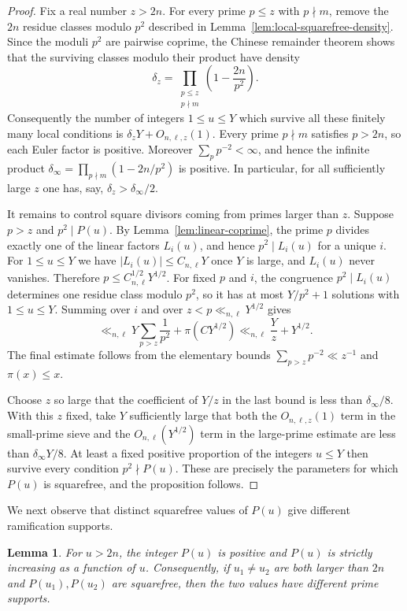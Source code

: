 \documentclass[11pt,hidelinks]{amsart}
\newtheorem{lemma}[theorem]{Lemma}
\begin{document}
\begin{proof}
Fix a real number $z>2n$.  For every prime $p\leq z$ with $p\nmid m$,
remove the $2n$ residue classes modulo $p^2$ described in
Lemma~\ref{lem:local-squarefree-density}.  Since the moduli $p^2$ are
pairwise coprime, the Chinese remainder theorem shows that the surviving
classes modulo their product have density
\[
 \delta_z=\prod_{\substack{p\leq z\\p\nmid m}}
 \left(1-\frac{2n}{p^2}\right).
\]
Consequently the number of integers $1\leq u\leq Y$ which survive all
these finitely many local conditions is
$\delta_zY+O_{n,\ell,z}(1)$.  Every prime $p\nmid m$ satisfies
$p>2n$, so each Euler factor is positive.  Moreover $\sum_pp^{-2}<\infty$, and hence the infinite product $\delta_\infty=\prod_{p\nmid m}(1-2n/p^2)$ is positive. In particular, for all sufficiently large $z$ one has, say,
$\delta_z>\delta_\infty/2$.

It remains to control square divisors coming from primes larger than
$z$.  Suppose $p>z$ and $p^2\mid P(u)$.  By
Lemma~\ref{lem:linear-coprime}, the prime $p$ divides exactly one of the
linear factors $L_i(u)$, and hence $p^2\mid L_i(u)$ for a unique $i$.
For $1\leq u\leq Y$ we have $|L_i(u)|\leq C_{n,\ell}Y$ once $Y$ is
large, and $L_i(u)$ never vanishes.  Therefore
$p\leq C_{n,\ell}^{1/2}Y^{1/2}$.  For fixed $p$ and $i$, the congruence
$p^2\mid L_i(u)$ determines one residue class modulo $p^2$, so it has at
most $Y/p^2+1$ solutions with $1\leq u\leq Y$.  Summing over $i$ and
over $z<p\ll_{n,\ell}Y^{1/2}$ gives
\[
 \ll_{n,\ell}
 Y\sum_{p>z}\frac1{p^2}
 +\pi(CY^{1/2})
 \ll_{n,\ell}
 \frac{Y}{z}+Y^{1/2}.
\]
The final estimate follows from the elementary bounds
$\sum_{p>z}p^{-2}\ll z^{-1}$ and $\pi(x)\leq x$.

Choose $z$ so large that the coefficient of $Y/z$ in the last bound is
less than $\delta_\infty/8$.  With this $z$ fixed, take $Y$ sufficiently
large that both the $O_{n,\ell,z}(1)$ term in the small-prime sieve and
the $O_{n,\ell}(Y^{1/2})$ term in the large-prime estimate are less than
$\delta_\infty Y/8$.  At least a fixed positive proportion of the
integers $u\leq Y$ then survive every condition $p^2\nmid P(u)$.
These are precisely the parameters for which $P(u)$ is squarefree,
and the proposition follows.
\end{proof}

We next observe that distinct squarefree values of $P(u)$ give different ramification supports.

\begin{lemma}\label{lem:distinct-values}
For $u>2n$, the integer $P(u)$ is positive and $P(u)$ is strictly increasing as a function of $u$. Consequently, if $u_1\neq u_2$ are both larger than $2n$ and $P(u_1),P(u_2)$ are squarefree, then the two values have different prime supports.
\end{lemma}
\end{document}
